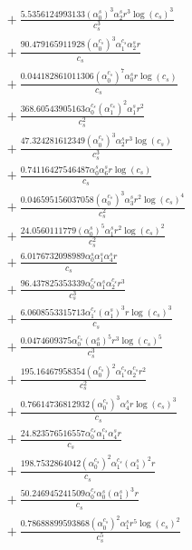 \documentclass[10pt]{article}
\begin{document}
\begin{align*}
&{}  + \frac{5.5356124993133 \left(\alpha_{0}^s\right)^{3} \alpha_{2}^s r^{3} \log{\left(c_{s} \right)}^{3}}{c_{s}^{3}} \\
&{}  + \frac{90.479165911928 \left(\alpha_{0}^{c_s}\right)^{3} \alpha_{1}^{c_s} \alpha_{2}^s r}{c_{s}} \\
&{}  + \frac{0.044182861011306 \left(\alpha_{0}^{c_s}\right)^{7} \alpha_{0}^s r \log{\left(c_{s} \right)}}{c_{s}} \\
&{}  + \frac{368.60543905163 \alpha_{0}^{c_s} \left(\alpha_{1}^{c_s}\right)^{2} \alpha_{1}^s r^{2}}{c_{s}^{2}} \\
&{}  + \frac{47.324281612349 \left(\alpha_{0}^{c_s}\right)^{3} \alpha_{2}^s r^{3} \log{\left(c_{s} \right)}}{c_{s}^{3}} \\
&{}  + \frac{0.74116427546487 \alpha_{0}^s \alpha_{6}^s r \log{\left(c_{s} \right)}}{c_{s}} \\
&{}  + \frac{0.046595156037058 \left(\alpha_{0}^{c_s}\right)^{3} \alpha_{3}^s r^{2} \log{\left(c_{s} \right)}^{4}}{c_{s}^{2}} \\
&{}  + \frac{24.0560111779 \left(\alpha_{0}^s\right)^{5} \alpha_{1}^s r^{2} \log{\left(c_{s} \right)}^{2}}{c_{s}^{2}} \\
&{}  + \frac{6.0176732098989 \alpha_{0}^s \alpha_{1}^s \alpha_{4}^s r}{c_{s}} \\
&{}  + \frac{96.437825353339 \alpha_{0}^{c_s} \alpha_{1}^s \alpha_{2}^{c_s} r^{3}}{c_{s}^{3}} \\
&{}  + \frac{6.0608553315713 \alpha_{1}^{c_s} \left(\alpha_{1}^s\right)^{3} r \log{\left(c_{s} \right)}^{3}}{c_{s}} \\
&{}  + \frac{0.0474609375 \alpha_{0}^{c_s} \left(\alpha_{0}^s\right)^{5} r^{3} \log{\left(c_{s} \right)}^{5}}{c_{s}^{3}} \\
&{}  + \frac{195.16467958354 \left(\alpha_{0}^{c_s}\right)^{2} \alpha_{1}^{c_s} \alpha_{2}^{c_s} r^{2}}{c_{s}^{2}} \\
&{}  + \frac{0.76614736812932 \left(\alpha_{0}^{c_s}\right)^{3} \alpha_{4}^s r \log{\left(c_{s} \right)}^{3}}{c_{s}} \\
&{}  + \frac{24.823576516557 \alpha_{0}^{c_s} \alpha_{1}^{c_s} \alpha_{4}^s r}{c_{s}} \\
&{}  + \frac{198.7532864042 \left(\alpha_{0}^{c_s}\right)^{2} \alpha_{1}^{c_s} \left(\alpha_{1}^s\right)^{2} r}{c_{s}} \\
&{}  + \frac{50.246945241509 \alpha_{0}^{c_s} \alpha_{0}^s \left(\alpha_{1}^s\right)^{3} r}{c_{s}} \\
&{}  + \frac{0.78688899593868 \left(\alpha_{0}^{c_s}\right)^{2} \alpha_{1}^s r^{5} \log{\left(c_{s} \right)}^{2}}{c_{s}^{5}} \\

\end{align*}
\end{document}
